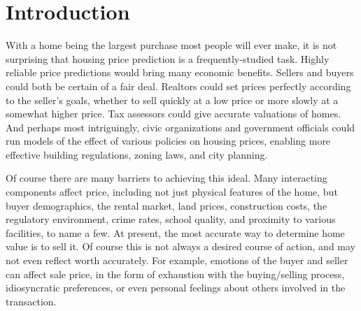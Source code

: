 \documentclass[fleqn,10pt]{SelfArx} %
\affiliation{\textsuperscript{1}\textit{Department of Computer Science, School of Informatics and Computing, Indiana University, Bloomington, IN, USA}} %
\affiliation{*\textbf{Corresponding author}: sasaha@iu.edu} %
\begin{document}
\flushbottom %

\maketitle %

\tableofcontents %

\thispagestyle{empty} %


\section*{Introduction} %



With a home being the largest purchase most people will ever make, it is not surprising that housing price prediction is a frequently-studied task. Highly reliable price predictions would bring many economic benefits. Sellers and buyers could both be certain of a fair deal. Realtors could set prices perfectly according to the seller's goals, whether to sell quickly at a low price or more slowly at a somewhat higher price. Tax assessors could give accurate valuations of homes. And perhaps most intriguingly, civic organizations and government officials could run models of the effect of various policies on housing prices, enabling more effective building regulations, zoning laws, and city planning.

Of course there are many barriers to achieving this ideal. Many interacting components affect price, including not just physical features of the home, but buyer demographics, the rental market, land prices, construction costs, the regulatory environment, crime rates, school quality, and proximity to various facilities, to name a few. At present, the most accurate way to determine home value is to sell it. Of course this is not always a desired course of action, and may not even reflect worth accurately. For example, emotions of the buyer and seller can affect sale price, in the form of exhaustion with the buying/selling process, idiosyncratic preferences, or even personal feelings about others involved in the transaction. 
\end{document}
